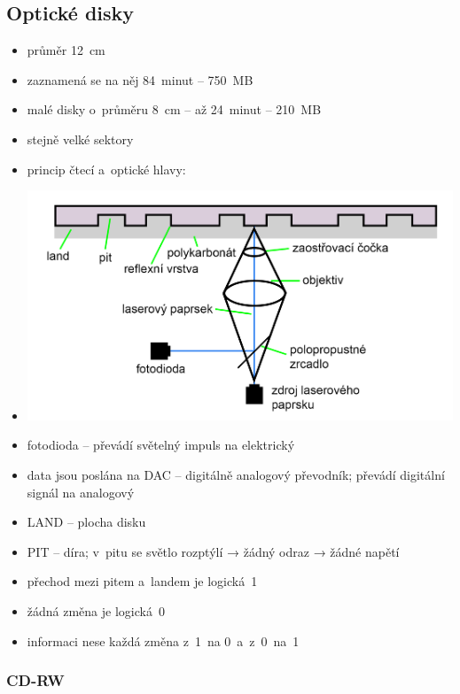 \documentclass[a4paper,12pt]{article}
\providecommand{\tightlist}{%
\setlength{\itemsep}{0pt}\setlength{\parskip}{0pt}}
\begin{document}
\subsection{Optické disky}

\begin{itemize}
\tightlist
\item průměr 12~cm
\item zaznamená se na něj 84~minut -- 750~MB
\item malé disky o~průměru 8~cm -- až 24~minut -- 210~MB
\item stejně velké sektory
\item princip čtecí a~optické hlavy:
\item[] \includegraphics[width=12.896cm]{ref/princip-cteci-a-opticke-hlavy.png}
\item fotodioda -- převádí světelný impuls na elektrický
\item data jsou poslána na DAC -- digitálně analogový převodník; převádí
  digitální signál na analogový
\item LAND -- plocha disku
\item PIT -- díra; v~pitu se světlo rozptýlí → žádný odraz → žádné napětí
\item přechod mezi pitem a~landem je logická~1
\item žádná změna je logická~0
\item informaci nese každá změna z~1~na 0~a~z~0~na~1
\end{itemize}

\subsubsection{CD-RW}
\end{document}
